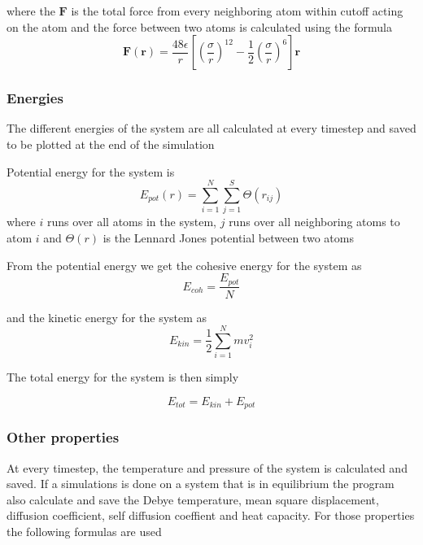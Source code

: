 \documentclass[12pt,a4paper]{article}
\begin{document}
where the \(\mathbf F\) is the total force from every neighboring atom within cutoff acting on the atom and the force between two atoms is calculated using the formula
\begin{equation}
\label{eq:force}
\mathbf F(\mathbf r)=\frac{48\epsilon}{r} \left[\left(\frac{\sigma}{r}\right)^{12} - \frac 1 2 \left(\frac{\sigma}{r}\right)^6\right] \mathbf r
\end{equation}

\subsubsection{Energies}
The different energies of the system are all calculated at every timestep and saved to be plotted at the end of the simulation

Potential energy for the system is 
\begin{equation}
E_{pot}(r)=\sum_{i=1}^N \sum_{j=1}^S \Theta(r_{ij})
\end{equation}
where \(i\) runs over all atoms in the system, \(j\) runs over all neighboring atoms to atom \(i\) and \( \Theta(r)\) is the Lennard Jones potential between two atoms 

From the potential energy we get the cohesive energy for the system as
\begin{equation}
\label{eq:Ecoh}
E_{coh}=\frac{E_{pot}} N
\end{equation}

and the kinetic energy for the system as
\begin{equation}
\label{eq:Ekin}
E_{kin}=\frac{1}2 \sum_{i=1}^N mv_i^2
\end{equation}

The total energy for the system is then simply

\begin{equation}
E_{tot} = E_{kin} + E_{pot}
\end{equation}

\subsubsection{Other properties}
At every timestep, the temperature and pressure of the system is calculated and saved. If a simulations is done on a system that is in equilibrium the program also calculate and save the Debye temperature, mean square displacement, diffusion coefficient, self diffusion coeffient and heat capacity. For those properties the following formulas are used
\end{document}
